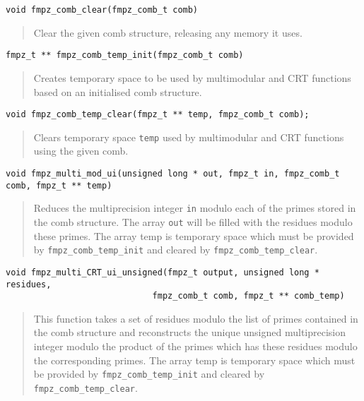 \documentclass[a4paper,10pt]{article}
\newcommand{\code}{\lstinline}
\begin{document}
\begin{lstlisting}
void fmpz_comb_clear(fmpz_comb_t comb) 
\end{lstlisting}
\begin{quote}
Clear the given comb structure, releasing any memory it uses. 
\end{quote}

\begin{lstlisting}
fmpz_t ** fmpz_comb_temp_init(fmpz_comb_t comb)
\end{lstlisting}
\begin{quote}
Creates temporary space to be used by multimodular and CRT functions based on an initialised comb structure.
\end{quote}

\begin{lstlisting}
void fmpz_comb_temp_clear(fmpz_t ** temp, fmpz_comb_t comb);
\end{lstlisting}
\begin{quote}
Clears temporary space \code{temp} used by multimodular and CRT functions using the given comb.
\end{quote}

\begin{lstlisting}
void fmpz_multi_mod_ui(unsigned long * out, fmpz_t in, fmpz_comb_t comb, fmpz_t ** temp)
\end{lstlisting}
\begin{quote}
Reduces the multiprecision integer \code{in} modulo each of the primes stored in the comb structure. The array \code{out} will be filled with the residues modulo these primes. The array temp is temporary space which must be provided by \code{fmpz_comb_temp_init} and cleared by \code{fmpz_comb_temp_clear}.
\end{quote}

\begin{lstlisting}
void fmpz_multi_CRT_ui_unsigned(fmpz_t output, unsigned long * residues, 
                             fmpz_comb_t comb, fmpz_t ** comb_temp)
\end{lstlisting}
\begin{quote}
This function takes a set of residues modulo the list of primes contained in the comb structure and reconstructs the unique unsigned multiprecision integer modulo the product of the primes which has these residues modulo the corresponding primes. The array temp is temporary space which must be provided by \code{fmpz_comb_temp_init} and cleared by \code{fmpz_comb_temp_clear}. 
\end{quote}
\end{document}
